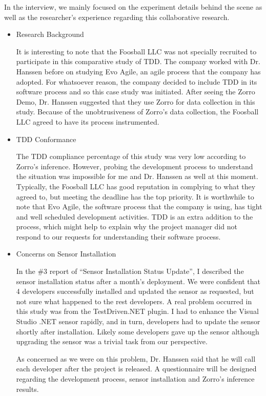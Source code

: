 In the interview, we mainly focused on the experiment details behind the scene as well as the researcher's experience regarding this collaborative research. 

\begin{itemize}
\item {Research Background}

It is interesting to note that the Foosball LLC was not specially recruited to participate in this comparative study of TDD. The company worked with Dr. Hanssen before on studying Evo Agile, an agile process that the company has adopted. For whatsoever reason, the company decided to include TDD in its software process and so this case study was initiated. After seeing the Zorro Demo, Dr. Hanssen suggested that they use Zorro for data collection in this study. Because of the unobtrusiveness of Zorro's data collection, the Foosball LLC agreed to have its process instrumented. 

\item {TDD Conformance}

The TDD compliance percentage of this study was very low according to Zorro's inference. However, probing the development process to understand the situation was impossible for me and Dr. Hanssen as well at this moment. Typically, the Foosball LLC has good reputation in complying to what they agreed to, but meeting the deadline has the top priority. It is worthwhile to note that Evo Agile, the software process that the company is using, has tight and well scheduled development activities. TDD is an extra addition to the process, which might help to explain why the project manager did not respond to our requests for understanding their software process.  

\item {Concerns on Sensor Installation}

In the \#3 report of ``Sensor Installation Status Update'', I described the sensor installation status after a month's deployment. We were confident that 4 developers successfully installed and updated the sensor as requested, but not sure what happened to the rest developers. A real problem occurred in this study was from the TestDriven.NET plugin. I had to enhance the Visual Studio .NET sensor rapidly, and in turn, developers had to update the sensor shortly after installation. Likely some developers gave up the sensor although upgrading the sensor was a trivial task from our perspective.

As concerned as we were on this problem, Dr. Hanssen said that he will call each developer after the project is released. A questionnaire will be designed regarding the development process, sensor installation and Zorro's inference results. 


\end{itemize}
